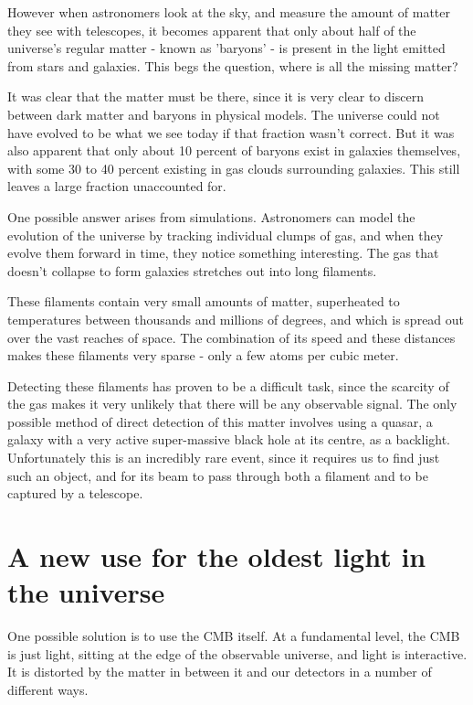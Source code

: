 \documentclass{nature}
\begin{document}
However when astronomers look at the sky, and measure the amount of matter they see with telescopes, it becomes apparent that only about half of the universe's regular matter - known as 'baryons' - is present in the light emitted from stars and galaxies. This begs the question, where is all the missing matter? 

It was clear that the matter must be there, since it is very clear to discern between dark matter and baryons in physical models. The universe could not have evolved to be what we see today if that fraction wasn't correct. But it was also apparent that only about 10 percent of baryons exist in galaxies themselves, with some 30 to 40 percent existing in gas clouds surrounding galaxies. This still leaves a large fraction unaccounted for. 

One possible answer arises from simulations. Astronomers can model the evolution of the universe by tracking individual clumps of gas, and when they evolve them forward in time, they notice something interesting. The gas that doesn’t collapse to form galaxies stretches out into long filaments.

These filaments contain very small amounts of matter, superheated to temperatures between thousands and millions of degrees, and which is spread out over the vast reaches of space. The combination of its speed and these distances makes these filaments very sparse - only a few atoms per cubic meter. 

Detecting these filaments has proven to be a difficult task, since the scarcity of the gas makes it very unlikely that there will be any observable signal. The only possible method of direct detection of this matter involves using a quasar, a galaxy with a very active super-massive black hole at its centre, as a backlight. Unfortunately this is an incredibly rare event, since it requires us to find just such an object, and for its beam to pass through both a filament and to be captured by a telescope. 

\section{A new use for the oldest light in the universe}

One possible solution is to use the CMB itself. At a fundamental level, the CMB is just light, sitting at the edge of the observable universe, and light is interactive. It is distorted by the matter in between it and our detectors in a number of different ways.
\end{document}
